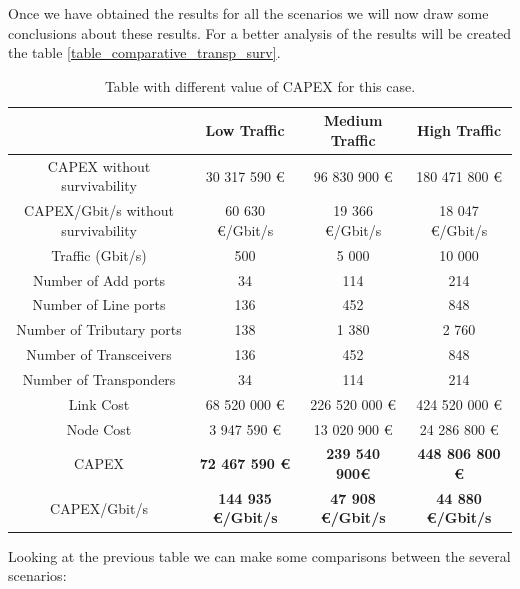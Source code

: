 Once we have obtained the results for all the scenarios we will now draw some conclusions about these results. For a better analysis of the results will be created the table \ref{table_comparative_transp_surv}.\\

\begin{table}[h!]
\centering
\begin{tabular}{| c | c | c | c |}
 \hline
  & Low Traffic & Medium Traffic  & High Traffic \\
 \hline\hline
 CAPEX without survivability&30 317 590 \euro&96 830 900 \euro&180 471 800 \euro\\ \hline
 CAPEX/Gbit/s without survivability&60 630 \euro/Gbit/s& 19 366 \euro/Gbit/s&18 047 \euro/Gbit/s\\ \hline
 Traffic (Gbit/s) & 500 & 5 000 & 10 000 \\ \hline
 Number of Add ports & 34 & 114 & 214 \\ \hline
 Number of Line ports & 136 & 452 & 848 \\ \hline
 Number of Tributary ports & 138 & 1 380 & 2 760 \\ \hline
 Number of Transceivers & 136 & 452 & 848 \\ \hline
 Number of Transponders & 34 & 114 & 214 \\ \hline
 Link Cost & 68 520 000 \euro & 226 520 000 \euro & 424 520 000 \euro \\ \hline
 Node Cost & 3 947 590 \euro & 13 020 900 \euro & 24 286 800 \euro \\ \hline
 CAPEX & \textbf{72 467 590 \euro} & \textbf{239 540 900\euro} & \textbf{448 806 800 \euro} \\ \hline
 CAPEX/Gbit/s & \textbf{144 935 \euro/Gbit/s} & \textbf{47 908 \euro/Gbit/s} & \textbf{44 880 \euro/Gbit/s}\\
 \hline
\end{tabular}
\caption{Table with different value of CAPEX for this case.}
\label{table_comparative_transp_protec}
\end{table}

\newpage
Looking at the previous table we can make some comparisons between the several scenarios:


